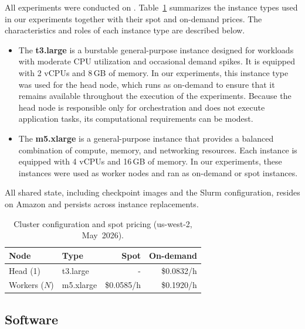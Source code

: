 \documentclass[conference]{IEEEtran}
\begin{document}
All experiments were conducted on \AWS. Table~\ref{tab:hardware} summarizes the instance types used in our experiments together with their spot and on-demand prices. The characteristics and roles of each instance type are described below.

\begin{itemize}
    \item The \textbf{t3.large} is a burstable general-purpose instance designed for workloads with moderate CPU utilization and occasional demand spikes. It is equipped with 2 vCPUs and 8\,GB of memory. In our experiments, this instance type was used for the head node, which runs as on-demand to ensure that it remains available throughout the execution of the experiments. Because the head node is responsible only for orchestration and does not execute application tasks, its computational requirements can be modest.

    \item The \textbf{m5.xlarge} is a general-purpose instance that provides a balanced combination of compute, memory, and networking resources. Each instance is equipped with 4 vCPUs and 16\,GB of memory. In our experiments, these instances were used as worker nodes and ran as on-demand or spot instances.
\end{itemize}

All shared state, including checkpoint images and the Slurm configuration, resides on Amazon \EFS and persists across instance replacements.

\begin{table}[t]
    \caption{Cluster configuration and spot pricing
             (\AWS us-west-2, May~2026).}
    \label{tab:hardware}
    \centering
    \small
    \begin{tabular}{llrr}
        \toprule
        \textbf{Node}         & \textbf{Type}      & \textbf{Spot}          & \textbf{On-demand}  \\
        \midrule
        Head (1)     & t3.large  & -             & \$0.0832/h \\
        Workers ($N$) & m5.xlarge & \$0.0585/h    & \$0.1920/h \\
        \bottomrule
    \end{tabular}
\end{table}

\subsection{Software}
\end{document}
